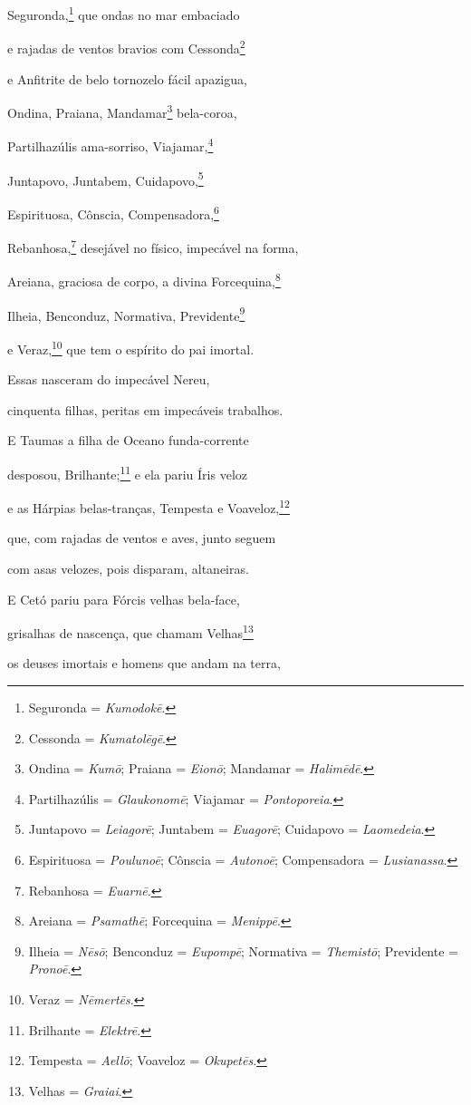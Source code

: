 \begin{pages}
\begin{Rightside}
Seguronda,\footnote{Seguronda = \emph{Kumodokē}.} que ondas no mar embaciado

e rajadas de ventos bravios com Cessonda\footnote{Cessonda = \emph{Kumatolēgē}.}

e Anfitrite de belo tornozelo fácil apazigua,

Ondina, Praiana, Mandamar\footnote{Ondina = \emph{Kumō}; Praiana = \emph{Eionō}; Mandamar =
\emph{Halimēdē}.} bela-coroa, 

Partilhazúlis ama-sorriso, Viajamar,\footnote{Partilhazúlis = \emph{Glaukonomē}; Viajamar = \emph{Pontoporeia}.}

Juntapovo, Juntabem, Cuidapovo,\footnote{Juntapovo = \emph{Leiagorē}; Juntabem = \emph{Euagorē}; Cuidapovo = \emph{Laomedeia}.}

Espirituosa, Cônscia, Compensadora,\footnote{Espirituosa = \emph{Poulunoē}; Cônscia = \emph{Autonoē};
Compensadora = \emph{Lusianassa}.}

Rebanhosa,\footnote{Rebanhosa = \emph{Euarnē}.} desejável no físico, impecável na forma,

Areiana, graciosa de corpo, a divina Forcequina,\footnote{Areiana = \emph{Psamathē}; Forcequina = \emph{Menippē}.} 

Ilheia, Benconduz, Normativa, Previdente\footnote{Ilheia = \emph{Nēsō}; Benconduz = \emph{Eupompē}; Normativa =
\emph{Themistō}; Previdente = \emph{Pronoē}.}

e Veraz,\footnote{Veraz = \emph{Nēmertēs}.} que tem o espírito do pai imortal.

Essas nasceram do impecável Nereu,

cinquenta filhas, peritas em impecáveis trabalhos.

\quad{}E Taumas a filha de Oceano funda-corrente 

desposou, Brilhante;\footnote{Brilhante = \emph{Elektrē}.} e ela pariu Íris veloz

e as Hárpias belas-tranças, Tempesta e Voaveloz,\footnote{Tempesta = \emph{Aellō}; Voaveloz = \emph{Okupetēs}.}

que, com rajadas de ventos e aves, junto seguem

com asas velozes, pois disparam, altaneiras.

\medskip

E Cetó pariu para Fórcis velhas bela-face, 

grisalhas de nascença, que chamam Velhas\footnote{Velhas = \emph{Graiai}.}

os deuses imortais e homens que andam na terra,


\end{Rightside}
\end{pages}
